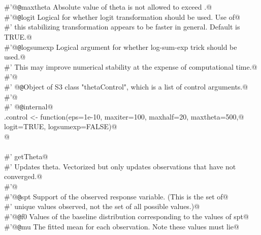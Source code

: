 \documentclass[reqno]{amsart}
\begin{document}
\begin{flushleft}
\begin{list}{}{}
\mbox{}\verb@#'@{\tt @}\verb@param maxtheta Absolute value of theta is not allowed to exceed .@\\
\mbox{}\verb@#'@{\tt @}\verb@param logit Logical for whether logit transformation should be used. Use of@\\
\mbox{}\verb@#' this stabilizing transformation appears to be faster in general. Default is TRUE.@\\
\mbox{}\verb@#'@{\tt @}\verb@param logsumexp Logical argument for whether log-sum-exp trick should be used.@\\
\mbox{}\verb@#' This may improve numerical stability at the expense of computational time.@\\
\mbox{}\verb@#'@\\
\mbox{}\verb@#' @{\tt @}\verb@return Object of S3 class "thetaControl", which is a list of control arguments.@\\
\mbox{}\verb@#'@\\
\mbox{}\verb@#' @{\tt @}\verb@keywords internal@\\
\mbox{}\verb@theta.control <- function(eps=1e-10, maxiter=100, maxhalf=20, maxtheta=500,@\\
\mbox{}\verb@                          logit=TRUE, logsumexp=FALSE)@\\
\mbox{}@\\
\mbox{}\verb@@\\
\mbox{}\verb@#' getTheta@\\
\mbox{}\verb@#' Updates theta. Vectorized but only updates observations that have not converged.@\\
\mbox{}\verb@#'@\\
\mbox{}\verb@#'@{\tt @}\verb@param spt Support of the observed response variable. (This is the set of@\\
\mbox{}\verb@#' unique values observed, not the set of all possible values.)@\\
\mbox{}\verb@#'@{\tt @}\verb@param f0 Values of the baseline distribution corresponding to the values of spt@\\
\mbox{}\verb@#'@{\tt @}\verb@param mu The fitted mean for each observation. Note these values must lie@\\

\end{list}
\end{flushleft}
\end{document}
